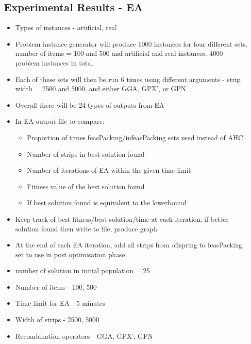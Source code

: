 \documentclass{elsarticle}
\begin{document}
\subsection{Experimental Results - EA}
\begin{itemize}
	\item Types of instances - artificial, real
	\item Problem instance generator will produce 1000 instances for four different sets, number of items = 100 and 500 and artificial and real instances, 4000 problem instances in total
	\item Each of these sets will then be run 6 times using different arguments - strip width = 2500 and 5000, and either GGA, GPX', or GPN
	\item Overall there will be 24 types of outputs from EA
	\item In EA output file to compare:
	\begin{itemize}
		\item Proportion of times feasPacking/infeasPacking sets used instead of AHC
		\item Number of strips in best solution found
		\item Number of iterations of EA within the given time limit
		\item Fitness value of the best solution found
		\item If best solution found is equivalent to the lowerbound
	\end{itemize}
	\item Keep track of best fitness/best solution/time at each iteration, if better solution found then write to file, produce graph
	\item At the end of each EA iteration, add all strips from offspring to feasPacking set to use in post optimisation phase
	\item number of solution in initial population = 25
	\item Number of items - 100, 500
	\item Time limit for EA - 5 minutes
	\item Width of strips - 2500, 5000
	\item Recombination operators - GGA, GPX', GPN
\end{itemize}
\end{document}

